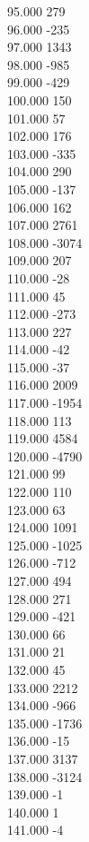 { 95.000	279 \\
 96.000	-235 \\
 97.000	1343 \\
 98.000	-985 \\
 99.000	-429 \\
 100.000	150 \\
 101.000	57 \\
 102.000	176 \\
 103.000	-335 \\
 104.000	290 \\
 105.000	-137 \\
 106.000	162 \\
 107.000	2761 \\
 108.000	-3074 \\
 109.000	207 \\
 110.000	-28 \\
 111.000	45 \\
 112.000	-273 \\
 113.000	227 \\
 114.000	-42 \\
 115.000	-37 \\
 116.000	2009 \\
 117.000	-1954 \\
 118.000	113 \\
 119.000	4584 \\
 120.000	-4790 \\
 121.000	99 \\
 122.000	110 \\
 123.000	63 \\
 124.000	1091 \\
 125.000	-1025 \\
 126.000	-712 \\
 127.000	494 \\
 128.000	271 \\
 129.000	-421 \\
 130.000	66 \\
 131.000	21 \\
 132.000	45 \\
 133.000	2212 \\
 134.000	-966 \\
 135.000	-1736 \\
 136.000	-15 \\
 137.000	3137 \\
 138.000	-3124 \\
 139.000	-1 \\
 140.000	1 \\
 141.000	-4 \\
}
